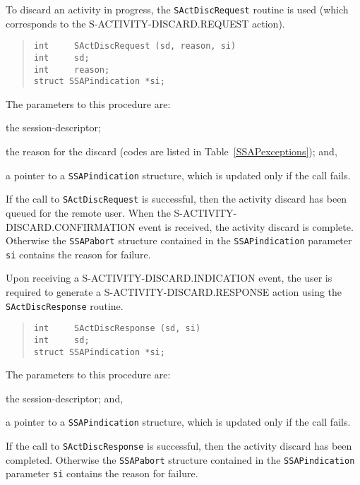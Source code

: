 To discard an activity in progress,
the \verb"SActDiscRequest" routine is used
(which corresponds to the {\sf S-ACTIVITY-DISCARD.REQUEST\/} action).
\begin{quote}\small\begin{verbatim}
int     SActDiscRequest (sd, reason, si)
int     sd;
int     reason;
struct SSAPindication *si;
\end{verbatim}\end{quote}
The parameters to this procedure are:
\begin{describe}
\item[\verb"sd":] the session-descriptor;

\item[\verb"reason":] the reason for the discard
(codes are listed in Table~\ref{SSAPexceptions});
and,

\item[\verb"si":] a pointer to a \verb"SSAPindication" structure, which is
updated only if the call fails.
\end{describe}
If the call to \verb"SActDiscRequest" is successful,
then the activity discard has been queued for the remote user.
When the {\sf S-ACTIVITY-DISCARD.CON\-FIR\-MA\-TION\/} event is received,
the activity discard is complete.
Otherwise the \verb"SSAPabort" structure contained in
the \verb"SSAPindication" parameter
\verb"si" contains the reason for failure.

Upon receiving a {\sf S-ACTIVITY-DISCARD.INDICATION\/} event,
the user is required to generate a {\sf S-ACTIVITY-DISCARD.RESPONSE\/} action
using the \verb"SActDiscResponse" routine.
\begin{quote}\small\begin{verbatim}
int     SActDiscResponse (sd, si)
int     sd;
struct SSAPindication *si;
\end{verbatim}\end{quote}
The parameters to this procedure are:
\begin{describe}
\item[\verb"sd":] the session-descriptor;
and,

\item[\verb"si":] a pointer to a \verb"SSAPindication" structure, which is
updated only if the call fails.
\end{describe}
If the call to \verb"SActDiscResponse" is successful,
then the activity discard has been completed.
Otherwise the \verb"SSAPabort" structure contained in
the \verb"SSAPindication" parameter
\verb"si" contains the reason for failure.


